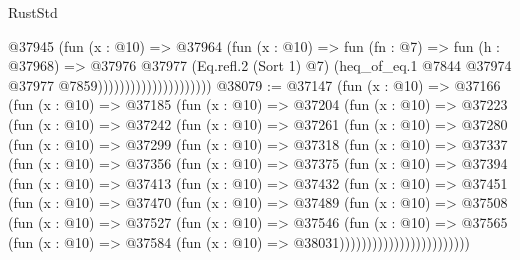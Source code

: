 \begin{lexlean}{RustStd}
\begin{coremodule}
{\begin{coremodule}
{{{{{{{{{{{{{{{{{{{{{{{{{{{{{{{{{{{{{{{{{{{{{{{{{{{{{{                                      @37945
                                        (fun (x : @10) =>
                                        @37964
                                          (fun (x : @10) =>
                                          fun (fn : @7) =>
                                          fun (h : @37968) =>
                                          @37976
                                            @37977
                                            (Eq.refl.{2} (Sort 1) @7)
                                            (heq_of_eq.{1}
                                              @7844
                                              @37974
                                              @37977
                                              @7859)))))))))))))))))))))
@38079 := @37147
    (fun (x : @10) =>
    @37166
      (fun (x : @10) =>
      @37185
        (fun (x : @10) =>
        @37204
          (fun (x : @10) =>
          @37223
            (fun (x : @10) =>
            @37242
              (fun (x : @10) =>
              @37261
                (fun (x : @10) =>
                @37280
                  (fun (x : @10) =>
                  @37299
                    (fun (x : @10) =>
                    @37318
                      (fun (x : @10) =>
                      @37337
                        (fun (x : @10) =>
                        @37356
                          (fun (x : @10) =>
                          @37375
                            (fun (x : @10) =>
                            @37394
                              (fun (x : @10) =>
                              @37413
                                (fun (x : @10) =>
                                @37432
                                  (fun (x : @10) =>
                                  @37451
                                    (fun (x : @10) =>
                                    @37470
                                      (fun (x : @10) =>
                                      @37489
                                        (fun (x : @10) =>
                                        @37508
                                          (fun (x : @10) =>
                                          @37527
                                            (fun (x : @10) =>
                                            @37546
                                              (fun (x : @10) =>
                                              @37565
                                                (fun (x : @10) =>
                                                @37584
                                                  (fun (x : @10) => @38031))))))))))))))))))))))))
}}}}}}}}}}}}}}}}}}}}}}}}}}}}}}}}}}}}}}}}}}}}}}}}}}}}}}
\end{coremodule}}
\end{coremodule}
\end{lexlean}
